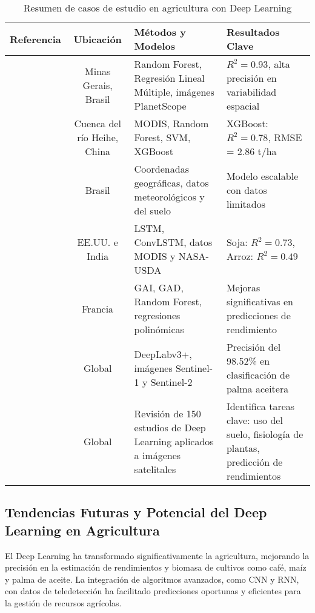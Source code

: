 \begin{table*}[t]
        \centering
        \caption{Resumen de casos de estudio en agricultura con Deep Learning}\label{tab:case_studies}
        \begin{tabular}{c c p{4.5cm} p{5.25cm}}
            \toprule
            \textbf{Referencia} & \textbf{Ubicación} & \textbf{Métodos y Modelos} & \textbf{Resultados Clave} \\ 
            \midrule
            \cite{martello2022} & Minas Gerais, Brasil & Random Forest, Regresión Lineal Múltiple, imágenes PlanetScope & $R^2 = 0.93$, alta precisión en variabilidad espacial \\ 
            \cite{geng2021} & Cuenca del río Heihe, China & MODIS, Random Forest, SVM, XGBoost & XGBoost: $R^2 = 0.78$, RMSE = 2.86 t/ha \\ 
            \cite{cunha2020} & Brasil & Coordenadas geográficas, datos meteorológicos y del suelo & Modelo escalable con datos limitados \\ 
            \cite{divakar2022} & EE.UU. e India & LSTM, ConvLSTM, datos MODIS y NASA-USDA & Soja: $R^2 = 0.73$, Arroz: $R^2 = 0.49$ \\ 
            \cite{debaeke2023} & Francia & GAI, GAD, Random Forest, regresiones polinómicas & Mejoras significativas en predicciones de rendimiento \\ 
            \cite{descals2021} & Global & DeepLabv3+, imágenes Sentinel-1 y Sentinel-2 & Precisión del 98.52\% en clasificación de palma aceitera \\ 
            \cite{victor2022} & Global & Revisión de 150 estudios de Deep Learning aplicados a imágenes satelitales & Identifica tareas clave: uso del suelo, fisiología de plantas, predicción de rendimientos \\ 
            \bottomrule
        \end{tabular}
\end{table*}

\subsection{Tendencias Futuras y Potencial del Deep Learning en Agricultura}

El Deep Learning ha transformado significativamente la agricultura, mejorando la precisión en la estimación de rendimientos y biomasa de cultivos como café, maíz y palma de aceite. La integración de algoritmos avanzados, como CNN y RNN, con datos de teledetección ha facilitado predicciones oportunas y eficientes para la gestión de recursos agrícolas.

